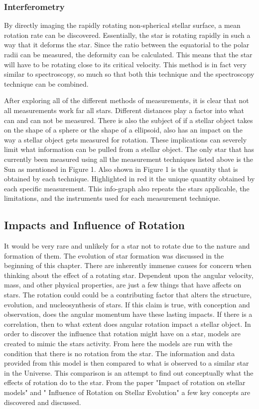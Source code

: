 \documentclass[a4paper, 12pt]{article}
\begin{document}
\subsubsection{Interferometry}

By directly imaging the rapidly rotating non-spherical stellar surface, a mean rotation rate can be discovered. Essentially, the star is rotating rapidly in such a way that it deforms the star. Since the ratio between the equatorial to the polar radii can be measured, the deformity can be calculated. This means that the star will have to be rotating close to its critical velocity. This method is in fact very similar to spectroscopy, so much so that both this technique and the spectroscopy technique can be combined.

After exploring all of the different methods of measurements, it is clear that not all measurements work far all stars. Different distances play a factor into what can and can not be measured. There is also the subject of if a stellar object takes on the shape of a sphere or the shape of a ellipsoid, also has an impact on the way a stellar object gets measured for rotation. These implications can severely limit what information can be pulled from a stellar object. The only star that has currently been measured using all the measurement techniques listed above is the Sun as mentioned in Figure 1. Also shown in Figure 1 is the quantity that is obtained by each technique. Highlighted in red it the unique quantity obtained by each specific measurement. This info-graph also repeats the stars applicable, the limitations, and the instruments used for each measurement technique. 

\subsection{Impacts and Influence of Rotation}

It would be very rare and unlikely for a star not to rotate due to the nature and formation of them. The evolution of star formation was discussed in the beginning of this chapter. There are inherently immense causes for concern when thinking about the effect of a rotating star. Dependent upon the angular velocity, mass, and other physical properties, are just a few things that have affects on stars. The rotation could could be a contributing factor that alters the structure, evolution, and nucleosynthesis of stars. If this claim is true, with conception and observation, does the angular momentum have these lasting impacts. If there is a correlation, then to what extent does angular rotation impact a stellar object. In order to discover the influence that rotation might have on a star, models are created to mimic the stars activity. From here the models are run with the condition that there is no rotation from the star. The information and data provided from this model is then compared to what is observed to a similar star in the Universe. This comparison is an attempt to find out conceptually what the effects of rotation do to the star. From the paper "Impact of rotation on stellar models" and "
Influence of Rotation on Stellar Evolution"  a few key concepts are discovered and discussed. 
\end{document}
